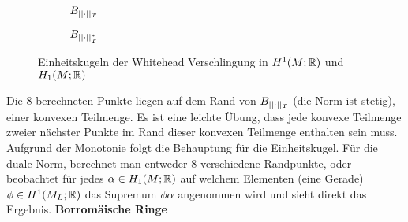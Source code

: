         \begin{figure}[H]
        \centering
        \begin{subfigure}[l]{0.4\textwidth}
                \caption{$B_{||\cdot||_T}$}
        
        
        \end{subfigure}    
        \hfill
    \begin{subfigure}[r]{0.4\textwidth}
    \caption{$B_{||\cdot||_T^*}$}

    \end{subfigure}
    \caption{Einheitskugeln der Whitehead Verschlingung in $H^1(M;\mathbb{R})$ und $H_1(M;\mathbb{R})$}
    \end{figure}
    Die $8$ berechneten Punkte liegen auf dem Rand von $B_{||\cdot||_T}$ (die Norm ist stetig), einer konvexen Teilmenge. Es ist eine leichte Übung, dass jede konvexe Teilmenge zweier nächster Punkte im Rand dieser konvexen Teilmenge enthalten sein muss. Aufgrund der Monotonie folgt die Behauptung für die Einheitskugel. Für die duale Norm, berechnet man entweder $8$ verschiedene Randpunkte, oder beobachtet für jedes $\alpha \in H_1(M;\mathbb{R})$ auf welchem Elementen (eine Gerade) $\phi \in H^1(M_L;\mathbb{R})$ das Supremum $\phi \alpha$ angenommen wird und sieht direkt das Ergebnis.
    \textbf{Borromäische Ringe}

